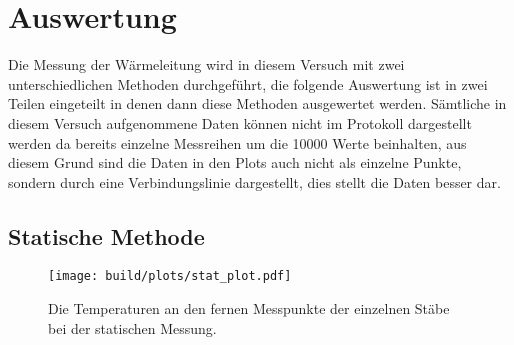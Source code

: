 \section{Auswertung}

    \noindent Die Messung der Wärmeleitung wird in diesem Versuch mit zwei unterschiedlichen Methoden durchgeführt, die folgende Auswertung ist 
    in zwei Teilen eingeteilt in denen dann diese Methoden ausgewertet werden. Sämtliche in diesem Versuch aufgenommene Daten können nicht im 
    Protokoll dargestellt werden da bereits einzelne Messreihen um die 10000 Werte beinhalten, aus diesem Grund sind die Daten in den Plots auch 
    nicht als einzelne Punkte, sondern durch eine Verbindungslinie dargestellt, dies stellt die Daten besser dar.

    \subsection{Statische Methode}

      \begin{figure}[H]
          \centering
          \texttt{[image: build/plots/stat\_plot.pdf]}
          \caption{Die Temperaturen an den fernen Messpunkte der einzelnen Stäbe bei der statischen Messung. }
          \label{fig:plot_stat}
      \end{figure}
    
